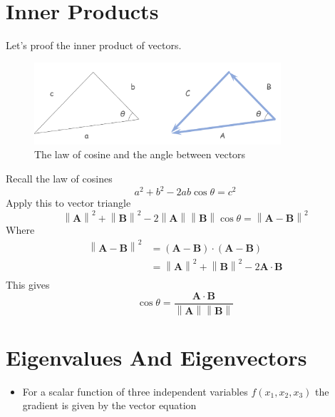 \section{Inner Products}
Let's proof the inner product of vectors.
\begin{figure}[!htbp]
    \centering
    \includegraphics[width=3.6in]{./images/The law of cosine and the angle between vectors.png}
    \caption{The law of cosine and the angle between vectors}
\end{figure}
Recall the law of cosines
\begin{equation} a^2 + b^2 - 2ab\cos\theta = c^2\end{equation}
Apply this to vector triangle
\begin{equation} \left\| \mathbf{A} \right\|^2 + \left\| \mathbf{B} \right\|^2 - 2\left\| \mathbf{A} \right\|\left\| \mathbf{B} \right\|\cos\theta = \left\| \mathbf{A} - \mathbf{B} \right\|^2\end{equation}
Where
\begin{equation} 
    \begin{aligned}
        \left\| \mathbf{A} - \mathbf{B} \right\|^2 &= \left(\mathbf{A}-\mathbf{B}\right) \cdot \left(\mathbf{A}-\mathbf{B}\right) \\
                                                   &= \left\| \mathbf{A} \right\|^2 + \left\| \mathbf{B} \right\|^2 -2\mathbf{A}\cdot\mathbf{B}\\
    \end{aligned}
\end{equation}
This gives
\begin{equation}
    \cos\theta = \frac{\mathbf{A}\cdot\mathbf{B}}{\left\|\mathbf{A}\right\|\left\|\mathbf{B}\right\|}
\end{equation}


\section{Eigenvalues And Eigenvectors}
\begin{itemize}
    \item For a scalar function of three independent variables $f(x_{1},x_{2},x_{3})$ the gradient is given by the vector equation
\end{itemize}            


